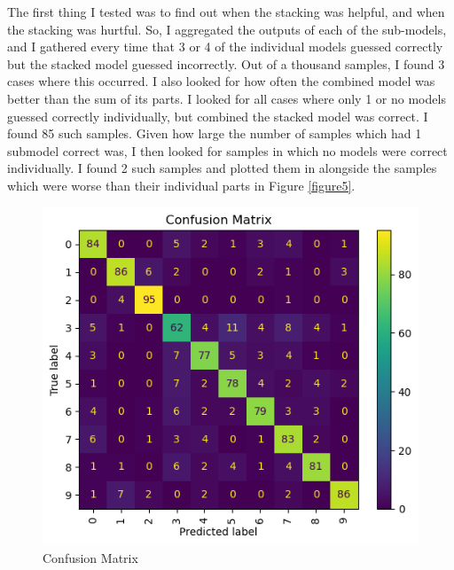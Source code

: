 \documentclass[12pt]{article}
\begin{document}
The first thing I tested was to find out when the stacking was helpful, and when the stacking was hurtful. 
So, I aggregated the outputs of each of the sub-models, and I gathered every time that 3 or 4 of the individual models 
guessed correctly but the stacked model guessed incorrectly. Out of a thousand samples, I found 3 cases where this 
occurred. I also looked for how often the combined model was better than the sum of its parts. I looked for 
all cases where only 1 or no models guessed correctly individually, but combined the stacked model was correct. I found
85 such samples. Given how large the number of samples which had 1 submodel correct was, I then looked for samples in which 
no models were correct individually. I found 2 such samples and plotted them in alongside the 
samples which were worse than their individual parts in Figure \ref{figure5}. 
\begin{figure}

    \includegraphics[width=.95\textwidth]{../../Deliverable/Final_CM.png}
    \caption{Confusion Matrix}
    \label{figure4}
\end{figure}
\end{document}

